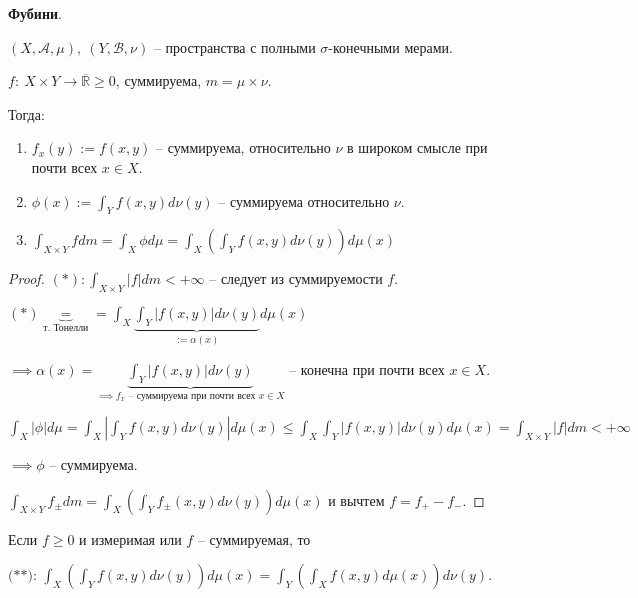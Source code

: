 \begin{theorem}
    \textbf{Фубини}.

    $(X, \mathcal{A}, \mu), \ (Y, \mathcal{B}, \nu)$ -- пространства с полными $\sigma$-конечными мерами.

    $f: \ X \times Y \rightarrow \overline{\mathbb{R}} \geq 0$, суммируема, $m = \mu \times \nu$.

    Тогда: 
    \begin{enumerate}
        \item {
            $f_x(y) := f(x, y)$ -- суммируема, относительно $\nu$ в широком смысле при почти всех $x \in X$.
        }
        \item {
            $\phi(x) := \int_Y { f(x, y) d \nu(y) }$ -- суммируема относительно $\nu$.
        }
        \item {
            $\int_{X \times Y} {f d m} = \int_{X} {\phi d \mu} = \int_{X} {\left(\int_{Y} {f(x, y) d \nu(y)}\right) d \mu(x)}$
        }
    \end{enumerate}
\end{theorem}
\begin{proof}
    $(*): \int_{X \times Y} {|f| d m} < +\infty$ -- следует из суммируемости $f$.
    
    $(*) \underbrace{=}_{\text{т. Тонелли}} = \int_{X} {\underbrace{\int_Y {|f(x, y)| d \nu(y)}}_{:= \alpha(x)} d \mu(x)}$

    $\implies \alpha(x) = \underbrace{\int_Y{|f(x, y)| d \nu(y)}}_{\implies f_x \text{ -- суммируема при почти всех } x \in X}$ -- конечна при почти всех $x \in X$.

    $\int_X{|\phi| d \mu} = \int_X{\left|\int_Y{f(x, y)d \nu(y)}\right| d \mu (x)} \leq \int_X{\int_Y{\left|f(x, y)\right|d \nu(y)} d \mu (x)} = \int_{X \times Y} {|f| d m} < +\infty$

    $\implies \phi$ -- суммируема.

    $\int_{X \times Y} {f_{\pm} d m} = \int_X { \left(\int_Y{f_{\pm}(x, y) d \nu(y)}\right) d \mu(x)}$ и вычтем $f = f_+ - f_-$.
\end{proof}

\begin{consequence}
    Если $f \geq 0$ и измеримая или  $f$ -- суммируемая, то 

    $\textbf{(**)}$: $\int_X{\left( \int_Y{f(x, y) d \nu(y)} \right) d \mu(x)} = \int_Y{\left( \int_X{f(x, y) d \mu(x) }\right) d \nu(y)}$.
\end{consequence}


